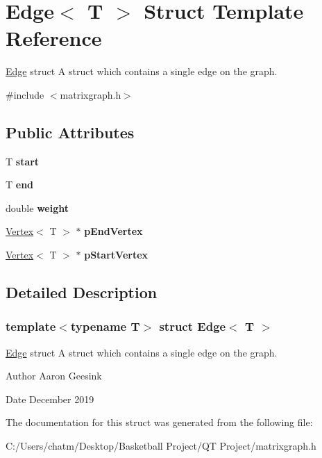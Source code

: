 \hypertarget{struct_edge}{}\section{Edge$<$ T $>$ Struct Template Reference}
\label{struct_edge}


\mbox{\hyperlink{struct_edge}{Edge}} struct A struct which contains a single edge on the graph.  




{\ttfamily \#include $<$matrixgraph.\+h$>$}

\subsection*{Public Attributes}
\begin{DoxyCompactItemize}
\item 
\mbox{\label{struct_edge_ae61075a136b0a9c7a76df39c4491f8e3}} 
T {\bfseries start}
\item 
\mbox{\label{struct_edge_a35886acba1ac9365b883573d2ae4073f}} 
T {\bfseries end}
\item 
\mbox{\label{struct_edge_af188b57b604f0d65e2da48733bd76426}} 
double {\bfseries weight}
\item 
\mbox{\label{struct_edge_a55cf7f9a73d047ea5e4da7e5f0f6a9c2}} 
\mbox{\hyperlink{struct_vertex}{Vertex}}$<$ T $>$ $\ast$ {\bfseries p\+End\+Vertex}
\item 
\mbox{\label{struct_edge_a1db1a980b41c2ab036112994cc46677c}} 
\mbox{\hyperlink{struct_vertex}{Vertex}}$<$ T $>$ $\ast$ {\bfseries p\+Start\+Vertex}
\end{DoxyCompactItemize}


\subsection{Detailed Description}
\subsubsection*{template$<$typename T$>$\newline
struct Edge$<$ T $>$}

\mbox{\hyperlink{struct_edge}{Edge}} struct A struct which contains a single edge on the graph. 

\begin{DoxyAuthor}{Author}
Aaron Geesink 
\end{DoxyAuthor}
\begin{DoxyDate}{Date}
December 2019 
\end{DoxyDate}


The documentation for this struct was generated from the following file\+:\begin{DoxyCompactItemize}
\item 
C\+:/\+Users/chatm/\+Desktop/\+Basketball Project/\+Q\+T Project/matrixgraph.\+h\end{DoxyCompactItemize}
